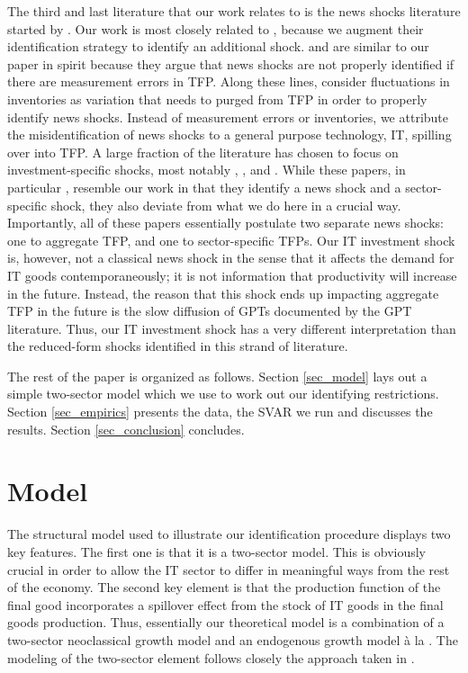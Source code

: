 \documentclass[11pt]{article}
\renewcommand{\[}{\begin{equation}}
\renewcommand{\]}{\end{equation}}
\begin{document}
The third and last literature that our work relates to is the news shocks literature started by  \cite{beaudry_portier2006}. Our work is most closely related to \cite{barsky_sims2011}, because we augment their identification strategy to identify an additional shock. \cite{bouakez_kemoe2017} and \cite{kurmann_sims2017} are similar to our paper in spirit because they argue that news shocks are not properly identified if there are measurement errors in TFP. Along these lines, \cite{crouzet_oh2016} consider fluctuations in inventories as variation that needs to purged from TFP in order to properly identify news shocks. Instead of measurement errors or inventories, we attribute the misidentification of news shocks to a general purpose technology, IT, spilling over into TFP.  A large fraction of the literature has chosen to focus on investment-specific shocks, most notably \cite{greenwood_etal1997}, \cite{fisher2006}, \cite{chen_wemy2015} and \cite{cummins_violante2002}. While these papers, in particular \cite{fisher2006}, resemble our work in that they identify a news shock and a sector-specific shock, they also deviate from what we do here in a crucial way. Importantly, all of these papers essentially postulate two separate news shocks: one to aggregate TFP, and one to sector-specific TFPs. Our IT investment shock is, however, not a classical news shock in the sense that it affects the demand for IT goods contemporaneously; it is not information that productivity will increase in the future. Instead, the reason that this shock ends up impacting aggregate TFP in the future is the slow diffusion of GPTs documented by the GPT literature. Thus, our IT investment shock has a very different interpretation than the reduced-form shocks identified in this strand of literature. 

The rest of the paper is organized as follows. Section \ref{sec_model} lays out a simple two-sector model which we use to work out our identifying restrictions. Section \ref{sec_empirics} presents the data, the SVAR we run and discusses the results. Section \ref{sec_conclusion} concludes. 



\section{Model}
The structural model used to illustrate our identification procedure displays two key features. The first one is that it is a two-sector model. This is obviously crucial in order to allow the IT sector to differ in meaningful ways from the rest of the economy. The second key element is that the production function of the final good incorporates a spillover effect from the stock of IT goods in the final goods production. Thus, essentially our theoretical model is a combination of a two-sector neoclassical growth model and an endogenous growth model \`a la \cite{romer1986}. The modeling of the two-sector element follows closely the approach taken in \cite{oulton2010}.
\end{document}
